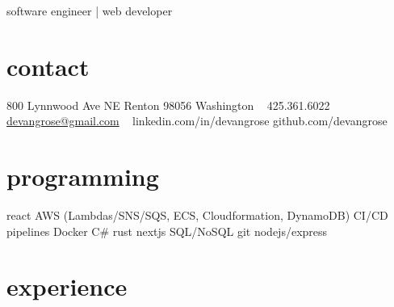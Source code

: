 \documentclass[]{friggeri-cv}
\begin{document}
       { software engineer | web developer }




\begin{aside}
  \section{contact}
    800 Lynnwood Ave NE
    Renton 98056
    Washington
    ~
    425.361.6022
    \href{mailto:devangrose@gmail.com}{devangrose@gmail.com}
    ~
    linkedin.com/in/devangrose
    github.com/devangrose
  \section{programming}
    react
    AWS (Lambdas/SNS/SQS, ECS, Cloudformation, DynamoDB)
    CI/CD pipelines
    Docker
    C\#
    rust
    nextjs
    SQL/NoSQL
    git
    nodejs/express

\end{aside}

\section{experience}
\end{document}
